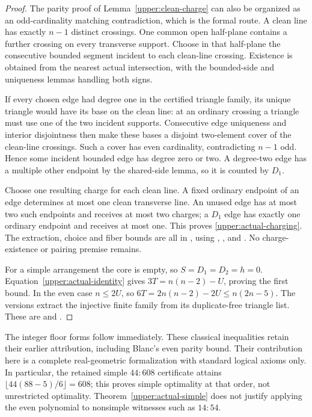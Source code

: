 \begin{proof}
The parity proof of Lemma~\ref{upper:clean-charge} can also be organized
as an odd-cardinality matching contradiction, which is the formal route.
A clean line has exactly $n-1$ distinct crossings. One common open
half-plane contains a further crossing on every transverse support.
Choose in that half-plane the consecutive bounded segment incident to
each clean-line crossing. Existence is obtained from the nearest actual
intersection, with the bounded-side and uniqueness lemmas handling
both signs.

If every chosen edge had degree one in the certified triangle family,
its unique triangle would have its base on the clean line: at an ordinary
crossing a triangle must use one of the two incident supports. Consecutive
edge uniqueness and interior disjointness then make these bases a
disjoint two-element cover of the clean-line crossings. Such a cover
has even cardinality, contradicting $n-1$ odd. Hence some incident
bounded edge has degree zero or two. A degree-two edge has a multiple
other endpoint by the shared-side lemma, so it is counted by $D_1$.

Choose one resulting charge for each clean line. A fixed ordinary
endpoint of an edge determines at most one clean transverse line.
An unused edge has at most two such endpoints and receives at most two
charges; a $D_1$ edge has exactly one ordinary endpoint and receives
at most one. This proves \eqref{upper:actual-charging}. The extraction,
choice and fiber bounds are all in
,
using , ,
 and . No charge-existence
or pairing premise remains.

For a simple arrangement the core is empty, so $S=D_1=D_2=h=0$.
Equation~\eqref{upper:actual-identity} gives $3T=n(n-2)-U$, proving the
first bound. In the even case $n\le2U$, so
$6T=2n(n-2)-2U\le n(2n-5)$.
The  versions extract the injective finite family
from its duplicate-free triangle list. These are
and
.
\end{proof}

The integer floor forms follow immediately. These classical inequalities
retain their earlier attribution, including Blanc's even parity bound.
Their contribution here is a complete real-geometric formalization with
standard logical axioms only. In particular, the retained simple
$44:608$ certificate attains $\lfloor44(88-5)/6\rfloor=608$; this
proves simple optimality at that order, not unrestricted optimality.
Theorem~\ref{upper:actual-simple} does not justify applying the even
polynomial to nonsimple witnesses such as $14:54$.

